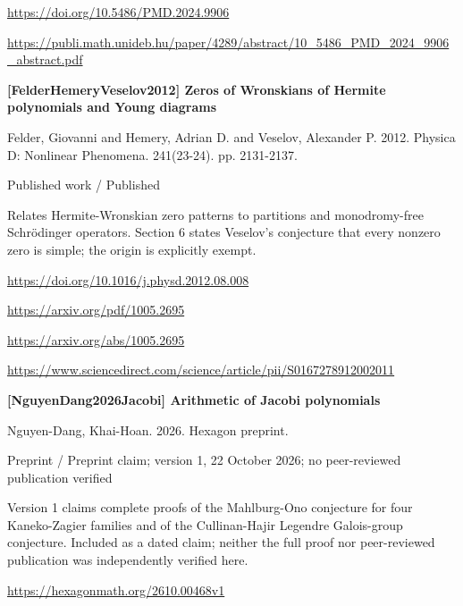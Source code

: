 \documentclass[11pt,a4paper,oneside,openany]{book}
\begin{document}
{\footnotesize\url{https://doi.org/10.5486/PMD.2024.9906}}\par
{\footnotesize\url{https://publi.math.unideb.hu/paper/4289/abstract/10_5486_PMD_2024_9906_abstract.pdf}}\par
\vspace{9pt}
\hypertarget{ref:FelderHemeryVeselov2012}{}
{\sffamily\bfseries\color{atlasgreen}[FelderHemeryVeselov2012] Zeros of Wronskians of Hermite polynomials and Young diagrams}\par
\color{black} Felder, Giovanni and Hemery, Adrian D. and Veselov, Alexander P. 2012. Physica D: Nonlinear Phenomena. 241(23-24). pp. 2131-2137.\par
{\small\sffamily\color{atlasgold}Published work / Published}\par
\color{black} Relates Hermite-Wronskian zero patterns to partitions and monodromy-free Schrödinger operators. Section 6 states Veselov's conjecture that every nonzero zero is simple; the origin is explicitly exempt.\par
{\footnotesize\url{https://doi.org/10.1016/j.physd.2012.08.008}}\par
{\footnotesize\url{https://arxiv.org/pdf/1005.2695}}\par
{\footnotesize\url{https://arxiv.org/abs/1005.2695}}\par
{\footnotesize\url{https://www.sciencedirect.com/science/article/pii/S0167278912002011}}\par
\vspace{9pt}
\hypertarget{ref:NguyenDang2026Jacobi}{}
{\sffamily\bfseries\color{atlasgreen}[NguyenDang2026Jacobi] Arithmetic of Jacobi polynomials}\par
\color{black} Nguyen-Dang, Khai-Hoan. 2026. Hexagon preprint.\par
{\small\sffamily\color{atlasgold}Preprint / Preprint claim; version 1, 22 October 2026; no peer-reviewed publication verified}\par
\color{black} Version 1 claims complete proofs of the Mahlburg-Ono conjecture for four Kaneko-Zagier families and of the Cullinan-Hajir Legendre Galois-group conjecture. Included as a dated claim; neither the full proof nor peer-reviewed publication was independently verified here.\par
{\footnotesize\url{https://hexagonmath.org/2610.00468v1}}\par
\vspace{9pt}
\hypertarget{ref:NguyenDang2026UniformLaguerre}{}
\end{document}
